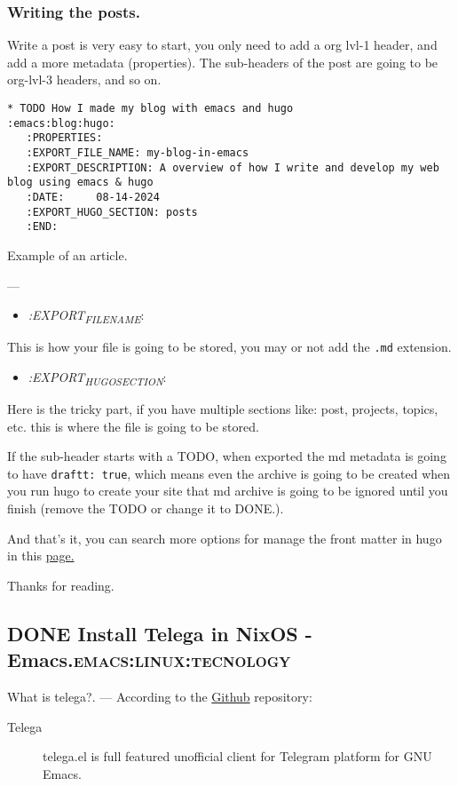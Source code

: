 \documentclass[11pt]{article}
\begin{document}
\subsubsection{Writing the posts.}
\label{sec:orgd7bba3a}
Write a post is very easy to start, you only need to add a org lvl-1 header, and add a more metadata (properties). The sub-headers of the post are going to be org-lvl-3 headers, and so on.

\begin{listing}[htbp]
\begin{verbatim}
* TODO How I made my blog with emacs and hugo               :emacs:blog:hugo:
   :PROPERTIES:
   :EXPORT_FILE_NAME: my-blog-in-emacs
   :EXPORT_DESCRIPTION: A overview of how I write and develop my web blog using emacs & hugo
   :DATE:     08-14-2024
   :EXPORT_HUGO_SECTION: posts
   :END:
\end{verbatim}
\caption{Example of an article.}
\end{listing}
---

\begin{itemize}
\item \emph{:EXPORT\textsubscript{FILE}\textsubscript{NAME}}:
\end{itemize}
This is how your file is going to be stored, you may or not add the \texttt{.md} extension.
\begin{itemize}
\item \emph{:EXPORT\textsubscript{HUGO}\textsubscript{SECTION}}:
\end{itemize}
Here is the tricky part, if you have multiple sections like: post, projects, topics, etc. this is where the file is going to be stored.

If the sub-header starts with a TODO, when exported the md metadata is going to have \texttt{draftt: true}, which means even the archive is going to be created when you run hugo to create your site that md archive is going to be ignored until you finish (remove the TODO or change it to DONE.).

And that's it, you can search more options for manage the front matter in hugo in this \href{https://ox-hugo.scripter.co/}{page.}

Thanks for reading.
\subsection{{\bfseries\sffamily DONE} Install Telega in NixOS - Emacs.\hfill{}\textsc{emacs:linux:tecnology}}
\label{sec:org1915b50}
What is telega?.
---
According to the \href{https://github.com/zevlg/telega.el}{Github} repository:
\begin{description}
\item[{Telega}] telega.el is full featured unofficial client for Telegram platform for GNU Emacs.
\end{description}
\end{document}
